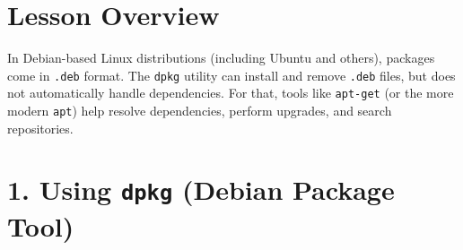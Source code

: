 \documentclass[a4paper]{report}
\begin{document}
\section*{Lesson Overview}

In Debian-based Linux distributions (including Ubuntu and others), packages come in \texttt{.deb} format. The \texttt{dpkg} utility can install and remove \texttt{.deb} files, but does not automatically handle dependencies. For that, tools like \texttt{apt-get} (or the more modern \texttt{apt}) help resolve dependencies, perform upgrades, and search repositories.

\section*{1. Using \texttt{dpkg} (Debian Package Tool)}
\end{document}
